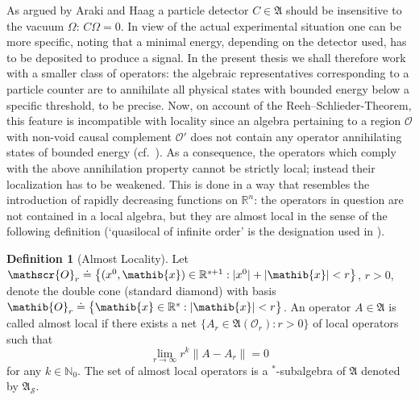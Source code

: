 \documentclass[11pt,twoside,openright]{report}
\theoremstyle{definition}
\newtheorem{Def}{Definition}[chapter]
\theoremstyle{plain}
\theoremstyle{remark}
\theoremstyle{assumption}
\newcommand{\bset}[1]{\bigl\{ #1 \bigr\}}
\newcommand{\abs}[1]{\lvert #1 \rvert}
\newcommand{\norm}[1]{\lVert #1 \rVert}
\newcommand{\Nbb}{\mathbb{N}}
\newcommand{\Rbb}{\mathbb{R}}
\newcommand{\Afrak}{\mathfrak{A}}
\newcommand{\Oib}{\mathib{O}}
\newcommand{\xib}{\mathib{x}}
\newcommand{\Oscr}{\mathscr{O}}
\newcommand{\Rs}{\mathbb{R}^s}
\newcommand{\Rsone}{\mathbb{R}^{s + 1}}
\newcommand{\AS}{\mathfrak{A}_{\mathscr{S}}}
\newcommand{\AOr}{\mathfrak{A} ( \mathscr{O}_r )}
\begin{document}
As argued by Araki and Haag \cite{araki/haag:1967} a particle detector
$C \in \Afrak$ should be insensitive to the vacuum $\Omega$: $C \Omega
= 0$. In view of the actual experimental situation one can be more
specific, noting that a minimal energy, depending on the detector
used, has to be deposited to produce a signal. In the present thesis
we shall therefore work with a smaller class of operators: the
algebraic representatives corresponding to a particle counter are to
annihilate all physical states with bounded energy below a specific
threshold, to be precise. Now, on account of the
Reeh--Schlieder-Theorem, this feature is incompatible with locality
since an algebra pertaining to a region $\Oscr$ with non-void causal
complement $\Oscr'$ does not contain any operator annihilating states
of bounded energy (cf.~\cite{reeh/schlieder:1961,haag:1996}). As a
consequence, the operators which comply with the above annihilation
property cannot be strictly local; instead their localization has to
be weakened. This is done in a way that resembles the introduction of
rapidly decreasing functions on $\Rbb^n$: the operators in question
are not contained in a local algebra, but they are almost local in the
sense of the following definition (`quasilocal of infinite order' is
the designation used in \cite{araki/haag:1967}).
\begin{Def}[Almost Locality]
  \label{Def-almost-locality}
  Let $\Oscr_r \doteq \bset{( x^0 , \xib ) \in \Rsone : \abs{x^0} +
  \abs{\xib} < r}$, $r > 0$, denote the double cone (standard diamond)
  with basis $\Oib_r \doteq \bset{\xib \in \Rs : \abs{\xib} < r}$. An
  operator $A \in \Afrak$ is called almost local if there exists a net
  $\bset{A_r \in \AOr : r > 0}$ of local operators such that 
  \begin{equation}
    \label{eq-almost-locality}
    \lim_{r \rightarrow \infty} r^k \norm{A - A_r} = 0
  \end{equation}
  for any $k \in \Nbb_0$. The set of almost local operators is a
  $^*$-subalgebra of $\Afrak$ denoted by $\AS$.
\end{Def}
\end{document}
